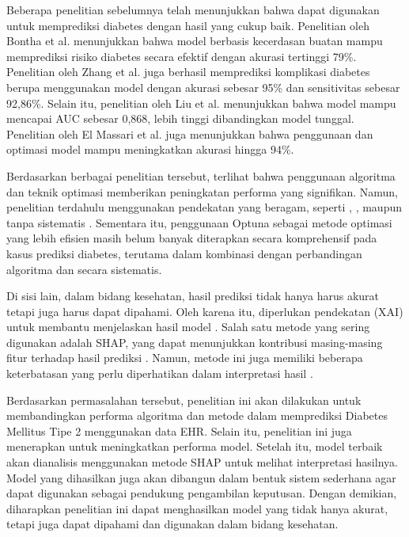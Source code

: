 Beberapa penelitian sebelumnya telah menunjukkan bahwa  dapat digunakan untuk memprediksi diabetes dengan hasil yang cukup baik. Penelitian oleh Bontha et al. \cite{ref19} menunjukkan bahwa model berbasis kecerdasan buatan mampu memprediksi risiko diabetes secara efektif dengan akurasi tertinggi 79\%. Penelitian oleh Zhang et al. \cite{ref20} juga berhasil memprediksi komplikasi diabetes berupa  menggunakan model  dengan akurasi sebesar 95\% dan sensitivitas sebesar 92,86\%. Selain itu, penelitian oleh Liu et al. \cite{ref21} menunjukkan bahwa model  mampu mencapai AUC sebesar 0,868, lebih tinggi dibandingkan model tunggal. Penelitian oleh El Massari et al. \cite{ref22} juga menunjukkan bahwa penggunaan  dan optimasi model mampu meningkatkan akurasi hingga 94\%.

Berdasarkan berbagai penelitian tersebut, terlihat bahwa penggunaan algoritma  dan teknik optimasi memberikan peningkatan performa yang signifikan. Namun, penelitian terdahulu menggunakan pendekatan  yang beragam, seperti , , maupun tanpa  sistematis \cite{ref10,ref22}. Sementara itu, penggunaan Optuna sebagai metode optimasi yang lebih efisien masih belum banyak diterapkan secara komprehensif pada kasus prediksi diabetes, terutama dalam kombinasi dengan perbandingan algoritma  dan  secara sistematis.

Di sisi lain, dalam bidang kesehatan, hasil prediksi tidak hanya harus akurat tetapi juga harus dapat dipahami. Oleh karena itu, diperlukan pendekatan  (XAI) untuk membantu menjelaskan hasil model \cite{ref23}. Salah satu metode yang sering digunakan adalah SHAP, yang dapat menunjukkan kontribusi masing-masing fitur terhadap hasil prediksi \cite{ref15,ref24}. Namun, metode ini juga memiliki beberapa keterbatasan yang perlu diperhatikan dalam interpretasi hasil \cite{ref25}.

Berdasarkan permasalahan tersebut, penelitian ini akan dilakukan untuk membandingkan performa algoritma  dan metode  dalam memprediksi Diabetes Mellitus Tipe 2 menggunakan data EHR. Selain itu, penelitian ini juga menerapkan  untuk meningkatkan performa model. Setelah itu, model terbaik akan dianalisis menggunakan metode SHAP untuk melihat interpretasi hasilnya. Model yang dihasilkan juga akan dibangun dalam bentuk sistem sederhana agar dapat digunakan sebagai pendukung pengambilan keputusan. Dengan demikian, diharapkan penelitian ini dapat menghasilkan model yang tidak hanya akurat, tetapi juga dapat dipahami dan digunakan dalam bidang kesehatan.

